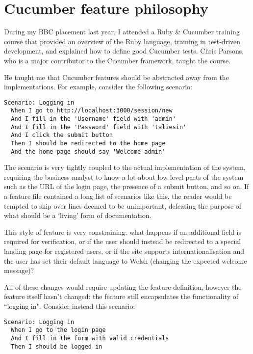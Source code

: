 \chapter{Cucumber feature philosophy}
\label{appendix:cucumber}

During my BBC placement last year, I attended a Ruby \& Cucumber training course that provided an overview of the Ruby language, training in test-driven development, and explained how to define good Cucumber tests.  Chris Parsons, who is a major contributor to the Cucumber framework, taught the course.

He taught me that Cucumber features should be abstracted away from the implementations. For example, consider the following scenario:

\begin{lstlisting}
Scenario: Logging in
  When I go to http://localhost:3000/session/new
  And I fill in the 'Username' field with 'admin'
  And I fill in the 'Password' field with 'taliesin'
  And I click the submit button
  Then I should be redirected to the home page
  And the home page should say 'Welcome admin'
\end{lstlisting}

The scenario is very tightly coupled to the actual implementation of the system, requiring the business analyst to know a lot about low level parts of the system such as the URL of the login page, the presence of a submit button, and so on. If a feature file contained a long list of scenarios like this, the reader would be tempted to skip over lines deemed to be unimportant, defeating the purpose of what should be a `living' form of documentation.~\cite{appendix:cucumber:livingDocumentation}

This style of feature is very constraining: what happens if an additional field is required for verification, or if the user should instead be redirected to a special landing page for registered users, or if the site supports internationalisation and the user has set their default language to Welsh (changing the expected welcome message)?

All of these changes would require updating the feature definition, however the feature itself hasn't changed: the feature still encapsulates the functionality of ``logging in". Consider instead this scenario:

\begin{lstlisting}
Scenario: Logging in
  When I go to the login page
  And I fill in the form with valid credentials
  Then I should be logged in
 \end{lstlisting}

